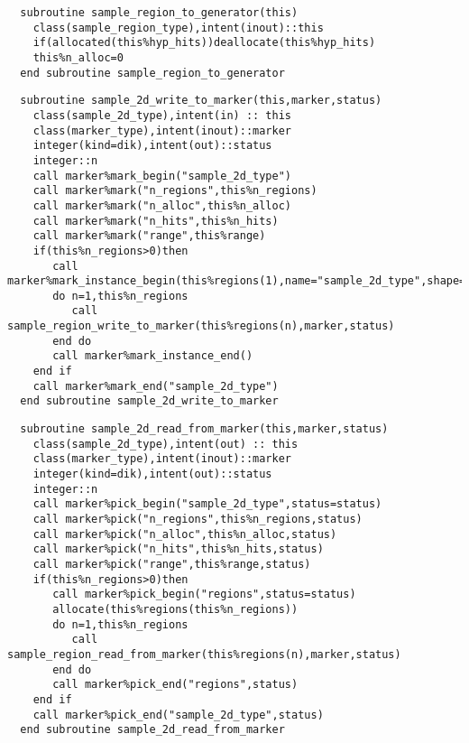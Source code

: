 \begin{Verbatim}
  subroutine sample_region_to_generator(this)
    class(sample_region_type),intent(inout)::this
    if(allocated(this%hyp_hits))deallocate(this%hyp_hits)
    this%n_alloc=0
  end subroutine sample_region_to_generator
\end{Verbatim}

\begin{Verbatim}
  subroutine sample_2d_write_to_marker(this,marker,status)
    class(sample_2d_type),intent(in) :: this
    class(marker_type),intent(inout)::marker
    integer(kind=dik),intent(out)::status
    integer::n
    call marker%mark_begin("sample_2d_type")
    call marker%mark("n_regions",this%n_regions)
    call marker%mark("n_alloc",this%n_alloc)
    call marker%mark("n_hits",this%n_hits)
    call marker%mark("range",this%range)
    if(this%n_regions>0)then
       call marker%mark_instance_begin(this%regions(1),name="sample_2d_type",shape=shape(this%regions))
       do n=1,this%n_regions
          call sample_region_write_to_marker(this%regions(n),marker,status)
       end do
       call marker%mark_instance_end()
    end if
    call marker%mark_end("sample_2d_type")
  end subroutine sample_2d_write_to_marker
\end{Verbatim}

\begin{Verbatim}
  subroutine sample_2d_read_from_marker(this,marker,status)
    class(sample_2d_type),intent(out) :: this
    class(marker_type),intent(inout)::marker
    integer(kind=dik),intent(out)::status  
    integer::n
    call marker%pick_begin("sample_2d_type",status=status)
    call marker%pick("n_regions",this%n_regions,status)
    call marker%pick("n_alloc",this%n_alloc,status)
    call marker%pick("n_hits",this%n_hits,status)
    call marker%pick("range",this%range,status)
    if(this%n_regions>0)then
       call marker%pick_begin("regions",status=status)
       allocate(this%regions(this%n_regions))
       do n=1,this%n_regions
          call sample_region_read_from_marker(this%regions(n),marker,status)
       end do
       call marker%pick_end("regions",status)
    end if
    call marker%pick_end("sample_2d_type",status)
  end subroutine sample_2d_read_from_marker
\end{Verbatim}


